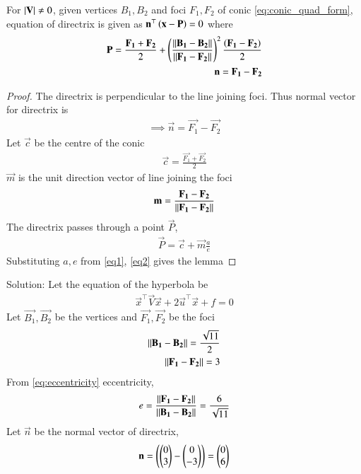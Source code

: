 \documentclass[journal,12pt,twocolumn]{IEEEtran}
\begin{document}
\begin{lemma}
For $\vert\mathbf{V}\vert \ne 0$, given vertices $B_1,B_2$ and foci $F_1,F_2$ of conic \eqref{eq:conic_quad_form}, equation of directrix is given as $\mathbf{n}^{\top}\left(\mathbf{x} - \mathbf{P}\right) = 0$ where
\begin{align}
    \mathbf{P} = \frac{\mathbf{F_1}+\mathbf{F_2}}{2} + \left(\frac{\lVert\mathbf{B_1}-\mathbf{B_2}\rVert}{\lVert\mathbf{F_1}-\mathbf{F_2}\rVert}\right)^2 \frac{\left(\mathbf{F_1}-\mathbf{F_2}\right)}{2}\\
    \mathbf{n} = \mathbf{F_1}-\mathbf{F_2}
\end{align}
\end{lemma}
\begin{proof}
The directrix is perpendicular to the line joining foci. Thus normal vector for directrix is
\begin{align}
    \implies \vec{n} = \vec{F_1}-\vec{F_2}
\end{align}
Let $\vec{c}$ be the centre of the conic
\begin{align}
    \vec{c} = \frac{\vec{F_1}+\vec{F_2}}{2}
\end{align}
$\vec{m}$ is the unit direction vector of line joining the foci
\begin{align}
    \mathbf{m} = \frac{\mathbf{F_1}-\mathbf{F_2}}{\lVert\mathbf{F_1}-\mathbf{F_2}\rVert}
\end{align}
The directrix passes through a point $\vec{P}$,
\begin{align}
    \vec{P} = \vec{c} + \vec{m}\frac{a}{e}
\end{align}
Substituting $a,e$ from \eqref{eq1}, \eqref{eq2} gives the lemma
\end{proof}
Solution: Let the equation of the hyperbola be
\begin{align}
     \vec{x}^{\top}\vec{V}\vec{x}+2\vec{u}^{\top}\vec{x}+f=0
\end{align}
Let $\vec{B_1}, \vec{B_2}$ be the vertices and $\vec{F_1}, \vec{F_2}$ be the foci
\begin{align}
    \lVert\mathbf{B_1}-\mathbf{B_2}\rVert = \frac{\sqrt{11}}{2}\\
    \lVert\mathbf{F_1}-\mathbf{F_2}\rVert = 3
\end{align}
From \eqref{eq:eccentricity} eccentricity,
\begin{align}
    e = \frac{\lVert\mathbf{F_1}-\mathbf{F_2}\rVert}{\lVert\mathbf{B_1}-\mathbf{B_2}\rVert} = \frac{6}{\sqrt{11}} 
\end{align}
Let $\vec{n}$ be the normal vector of directrix,
\begin{align}
    \mathbf{n} = \left(\begin{pmatrix}0\\3\end{pmatrix}-\begin{pmatrix}0\\-3\end{pmatrix}\right) =  \begin{pmatrix}0\\6\end{pmatrix}
\end{align}
\end{document}
